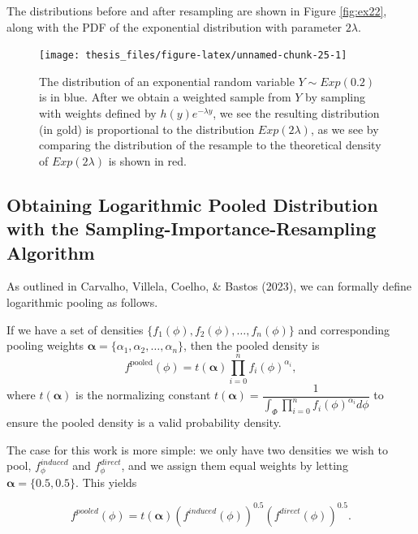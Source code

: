 \documentclass[12pt,twoside]{smiththesis}
\begin{document}
The distributions before and after resampling are shown in Figure \ref{fig:ex22}, along with the PDF of the exponential distribution with parameter \(2\lambda\).
\begin{figure}

{\centering \texttt{[image: thesis\_files/figure-latex/unnamed-chunk-25-1]} 

}

\caption{\label{fig:ex22}The distribution of an exponential random variable $Y \sim Exp(0.2)$ is in blue. After we obtain a weighted sample from $Y$ by sampling with weights defined by $h(y) e^{-\lambda y}$, we see the resulting distribution (in gold) is proportional to the distribution $Exp(2\lambda)$, as we see by comparing the distribution of the resample to the theoretical density of  $Exp(2\lambda)$ is shown in red.}\label{fig:unnamed-chunk-25}
\end{figure}
\newpage

\hypertarget{logpooled}{%
\subsection{Obtaining Logarithmic Pooled Distribution with the Sampling-Importance-Resampling Algorithm}\label{logpooled}}

As outlined in Carvalho, Villela, Coelho, \& Bastos (2023), we can formally define logarithmic pooling as follows.

If we have a set of densities \(\{ f_1(\phi), f_2(\phi), \ldots, f_n(\phi)\}\) and corresponding pooling weights \(\boldsymbol{\alpha}=\{\alpha_1, \alpha_2, \ldots, \alpha_n\}\), then the pooled density is
\[f^{\text{pooled}}(\phi) = t(\boldsymbol{\alpha}) \prod_{i=0}^n f_i(\phi)^{\alpha_i},\]
where \(t(\boldsymbol{\alpha})\) is the normalizing constant \(t(\boldsymbol{\alpha}) = \dfrac{1}{ \int_{\Phi}\prod_{i=0}^n f_i(\phi)^{\alpha_i} d\phi}\) to ensure the pooled density is a valid probability density.

The case for this work is more simple: we only have two densities we wish to pool, \(f_\phi^{induced}\) and \(f_\phi^{direct}\), and we assign them equal weights by letting \(\boldsymbol{\alpha} = \{0.5, 0.5\}\). This yields

\[f^{pooled}(\phi) = t(\boldsymbol \alpha) \left( f^{induced} (\phi) \right)^{0.5} \left( f^{direct} (\phi) \right)^{0.5}.\]
\end{document}
